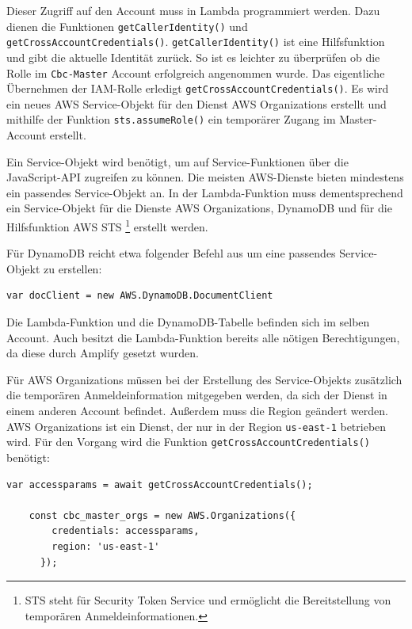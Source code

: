 Dieser Zugriff auf den Account muss in Lambda programmiert werden.
Dazu dienen die Funktionen \verb+getCallerIdentity()+ und \verb+getCrossAccountCredentials()+.
\verb+getCallerIdentity()+ ist eine Hilfsfunktion und gibt die aktuelle Identität zurück.
So ist es leichter zu überprüfen ob die Rolle im \verb+Cbc-Master+ Account erfolgreich angenommen wurde.
Das eigentliche Übernehmen der IAM-Rolle erledigt \verb+getCrossAccountCredentials()+.
Es wird ein neues AWS Service-Objekt für den Dienst AWS Organizations erstellt und mithilfe der Funktion \verb+sts.assumeRole()+ ein temporärer Zugang im Master-Account erstellt.

Ein Service-Objekt wird benötigt, um auf Service-Funktionen über die JavaScript-API zugreifen zu können.
Die meisten AWS-Dienste bieten mindestens ein passendes Service-Objekt an.
In der Lambda-Funktion muss dementsprechend ein Service-Objekt für die Dienste AWS Organizations, DynamoDB und für die Hilfsfunktion AWS STS \footnote{STS steht für Security Token Service und ermöglicht die Bereitstellung von temporären Anmeldeinformationen.} erstellt werden.
\cite[]{ServiceObject}

Für DynamoDB reicht etwa folgender Befehl aus um eine passendes Service-Objekt zu erstellen:
\begin{lstlisting}[basicstyle=\ttfamily\small, breaklines=true , frame = single, backgroundcolor=\color{lightgray} ]
    var docClient = new AWS.DynamoDB.DocumentClient
\end{lstlisting}

Die Lambda-Funktion und die DynamoDB-Tabelle befinden sich im selben Account.
Auch besitzt die Lambda-Funktion bereits alle nötigen Berechtigungen, da diese durch Amplify gesetzt wurden.

Für AWS Organizations müssen bei der Erstellung des Service-Objekts zusätzlich die temporären Anmeldeinformation mitgegeben werden, da sich der Dienst in einem anderen Account befindet.
Außerdem muss die Region geändert werden. AWS Organizations ist ein Dienst, der nur in der Region \verb+us-east-1+ betrieben wird.
Für den Vorgang wird die Funktion \verb+getCrossAccountCredentials()+ benötigt:

\begin{lstlisting}[basicstyle=\ttfamily\small, breaklines=true , frame = single, backgroundcolor=\color{lightgray} ]
    var accessparams = await getCrossAccountCredentials();

    const cbc_master_orgs = new AWS.Organizations({
        credentials: accessparams,
        region: 'us-east-1'
      });
\end{lstlisting}

